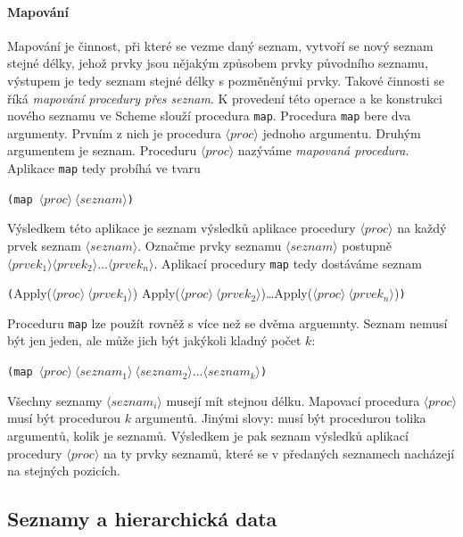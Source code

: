 \documentclass[10pt,a4paper]{article}
\begin{document}
    \paragraph{Mapování} Mapování je činnost, při které se vezme daný seznam, vytvoří se nový seznam stejné délky, jehož prvky jsou nějakým způsobem  prvky původního seznamu, výstupem je tedy seznam stejné délky s pozměněnými prvky. Takové činnosti se říká \textit{mapování procedury přes seznam}. K provedení této operace a ke konstrukci nového seznamu ve Scheme slouží procedura \texttt{map}. Procedura \texttt{map} bere dva argumenty. Prvním z nich je procedura $\langle proc \rangle$ jednoho argumentu. Druhým argumentem je seznam. Proceduru $\langle proc \rangle$ nazýváme \textit{mapovaná procedura}. Aplikace \texttt{map} tedy probíhá ve tvaru

    \hspace{4ex} \texttt{(map $\langle proc \rangle\ \langle seznam \rangle$)}

    Výsledkem této aplikace je seznam výsledků aplikace procedury $\langle proc \rangle$ na každý prvek seznam $\langle seznam \rangle$. Označme prvky seznamu $\langle seznam \rangle$ postupně $\langle prvek_1 \rangle \langle prvek_2 \rangle \ldots \langle prvek_n \rangle $. Aplikací procedury \texttt{map} tedy dostáváme seznam

    \hspace{4ex}\texttt{(}Apply($\langle proc \rangle\ \langle prvek_1 \rangle$) Apply($\langle proc \rangle\ \langle prvek_2 \rangle$)\ldots Apply($\langle proc \rangle\ \langle prvek_n \rangle$)\texttt{)}

    Proceduru \texttt{map} lze použít rovněž s více než se dvěma arguemnty. Seznam nemusí být jen jeden, ale může jich být jakýkoli kladný počet $k$:

    \hspace{4ex} \texttt{(map $\langle proc \rangle\ \langle seznam_1 \rangle\ \langle seznam_2 \rangle\ldots\langle seznam_k \rangle$)}

    Všechny seznamy $\langle seznam_i \rangle$ musejí mít stejnou délku. Mapovací procedura $\langle proc \rangle$ musí být procedurou $k$ argumentů. Jinými slovy: musí být procedurou tolika argumentů, kolik je seznamů. Výsledkem je pak seznam výsledků aplikací procedury $\langle proc \rangle$ na ty prvky seznamů, které se v předaných seznamech nacházejí na stejných pozicích.
  \subsection{Seznamy a hierarchická data}
\end{document}
